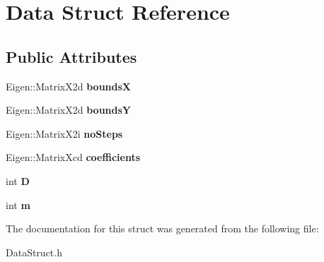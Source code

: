 \hypertarget{structData}{}\section{Data Struct Reference}
\label{structData}
\subsection*{Public Attributes}
\begin{DoxyCompactItemize}
\item 
\mbox{\label{structData_a5d52cb2b68c752fa8b74b86ccb1d7e3d}} 
Eigen\+::\+Matrix\+X2d {\bfseries boundsX}
\item 
\mbox{\label{structData_aa34a405b70244ad387719f8d38de51ed}} 
Eigen\+::\+Matrix\+X2d {\bfseries boundsY}
\item 
\mbox{\label{structData_a97a70b84170c9d1e46705fc5a8e1db20}} 
Eigen\+::\+Matrix\+X2i {\bfseries no\+Steps}
\item 
\mbox{\label{structData_aa8aaf26f991decdf85559d5fa417f520}} 
Eigen\+::\+Matrix\+Xcd {\bfseries coefficients}
\item 
\mbox{\label{structData_afe887f8ffbf8e145e0277093134cabcc}} 
int {\bfseries D}
\item 
\mbox{\label{structData_ab256a1176f3ba99a220c648b0c855840}} 
int {\bfseries m}
\end{DoxyCompactItemize}


The documentation for this struct was generated from the following file\+:\begin{DoxyCompactItemize}
\item 
Data\+Struct.\+h\end{DoxyCompactItemize}
